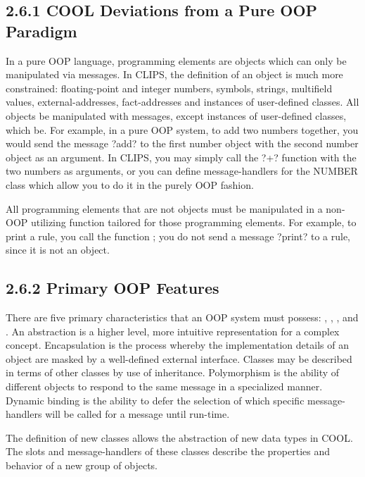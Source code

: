 \documentclass[letterpaper,10pt,english]{sphinxmanual}
\begin{document}
\subsection{2.6.1 COOL Deviations from a Pure OOP Paradigm}
\label{\detokenize{overview:cool-deviations-from-a-pure-oop-paradigm}}
In a pure OOP language,  programming elements are objects which can
only be manipulated via messages. In CLIPS, the definition of an object
is much more constrained: floating-point and integer numbers, symbols,
strings, multifield values, external-addresses, fact-addresses and
instances of user-defined classes. All objects  be manipulated with
messages, except instances of user-defined classes, which  be. For
example, in a pure OOP system, to add two numbers together, you would
send the message ?add? to the first number object with the second number
object as an argument. In CLIPS, you may simply call the ?+? function
with the two numbers as arguments, or you can define message-handlers
for the NUMBER class which allow you to do it in the purely OOP fashion.

All programming elements that are not objects must be manipulated in a
non-OOP utilizing function tailored for those programming elements. For
example, to print a rule, you call the function ; you do
not send a message ?print? to a rule, since it is not an object.


\subsection{2.6.2 Primary OOP Features}
\label{\detokenize{overview:primary-oop-features}}
There are five primary characteristics that an OOP system must possess:
, , , 
and . An abstraction is a higher level, more
intuitive representation for a complex concept. Encapsulation is the
process whereby the implementation details of an object are masked by a
well-defined external interface. Classes may be described in terms of
other classes by use of inheritance. Polymorphism is the ability of
different objects to respond to the same message in a specialized
manner. Dynamic binding is the ability to defer the selection of which
specific message-handlers will be called for a message until run-time.

The definition of new classes allows the abstraction of new data types
in COOL. The slots and message-handlers of these classes describe the
properties and behavior of a new group of objects.
\end{document}
